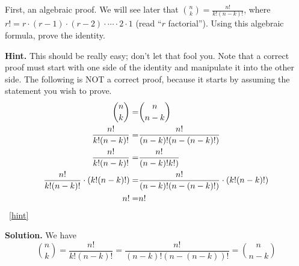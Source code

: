 \documentclass{book}
\begin{document}
\setcounter{project}{72}
\addtocounter{project}{-1}
\begin{activity}[]\label{activity-65}
\hypertarget{p-580}{}%
First, an algebraic proof.  We will see later that \(\binom{n}{k} = \frac{n!}{k!(n-k)!}\), where \(r! = r \cdot (r-1) \cdot (r-2) \cdot\cdots\cdot 2\cdot 1\) (read ``\(r\) factorial'').  Using this algebraic formula, prove the identity.%
\par\smallskip%
\noindent\textbf{Hint.}\hypertarget{hint-27}{}\quad%
\hypertarget{p-581}{}%
This should be really easy; don't let that fool you.  Note that a correct proof must start with one side of the identity and manipulate it into the other side.  The following is NOT a correct proof, because it starts by assuming the statement you wish to prove.%
\begin{align*}
\binom{n}{k}  = & \binom{n}{n-k}\\
\frac{n!}{k!(n-k)!} =  & \frac{n!}{(n-k)!(n-(n-k)!)}\\
\frac{n!}{k!(n-k)!} =  & \frac{n!}{(n-k)!k!)}\\
\frac{n!}{k!(n-k)!} \cdot (k!(n-k)!)=  & \frac{n!}{(n-k)!(n-(n-k)!)}\cdot(k!(n-k)!)\\
n! =  & n!
\end{align*}
%
~\hfill{\tiny\hyperlink{a-72}{[hint]}\hypertarget{q-72}{}}\par\smallskip%
\noindent\textbf{Solution.}\hypertarget{solution-54}{}\quad%
\hypertarget{p-582}{}%
We have%
\begin{equation*}
\binom{n}{k} = \frac{n!}{k!(n-k)!} = \frac{n!}{(n-k)!(n-(n-k))!} = \binom{n}{n-k}
\end{equation*}
%
\end{activity}
\end{document}
